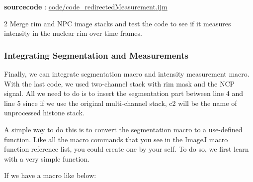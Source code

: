 \textbf{sourcecode} : \href{https://github.com/miura/BIAS_Nucleus_Segmentation/blob/struct_authorea/code_redirectedMeasurement.ijm}{code/code\_redirectedMeasurement.ijm}

\begin{indentexercise}
{2}
Merge rim and NPC image stacks and test the code to see if it measures intensity in the nuclear rim over time frames. 

\end{indentexercise}

\subsubsection{Integrating Segmentation and Measurements}

Finally, we can integrate segmentation macro and intensity measurement macro. With the last code, we used  two-channel stack with rim mask and the NCP signal. All we need to do is to insert the segmentation part between line 4 and line 5 since if we use the original multi-channel stack, c2 will be the name of unprocessed histone stack.

A simple way to do this is to convert the segmentation macro to a use-defined function. Like all the macro commands that you see in the ImageJ macro function reference list, you could create one by your self. To do so, we first learn with a very simple function.

If we have a macro like below: